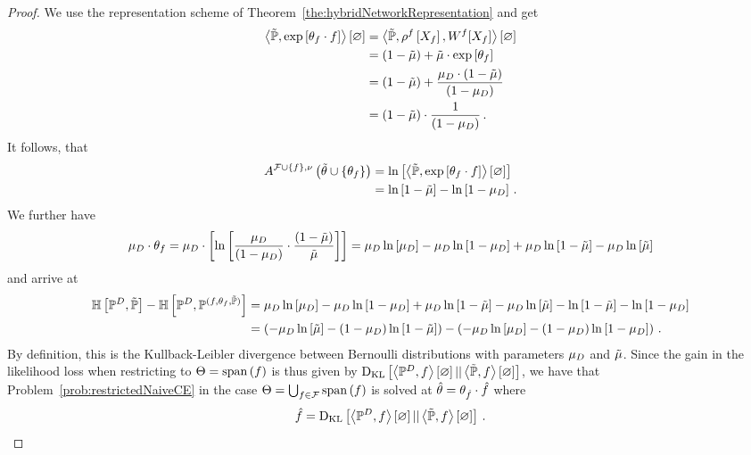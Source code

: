 \begin{proof}
	We use the representation scheme of Theorem~\ref{the:hybridNetworkRepresentation} and get
	\begin{align*}
		\left\langle \tilde{\mathbb{P}}, \mathrm{exp}\left[\theta_{f} \cdot f\right]\right\rangle \left[ \varnothing \right]
		& = \left\langle \tilde{\mathbb{P}}, \rho^{f}\left[X_{f}\right], W^{f}[X_{f}]\right\rangle \left[ \varnothing \right] \\
		& = (1-\tilde{\mu}) + \tilde{\mu}\cdot \mathrm{exp}\left[\theta_{f}\right] \\
		& = (1 - \tilde{\mu}) + \frac{\mu_{D} \cdot (1-\tilde{\mu})}{(1-\mu_{D})} \\
		& = (1-\tilde{\mu}) \cdot \frac{1}{(1-\mu_{D})} \, . 
	\end{align*}
	It follows, that
	\begin{align*}
		A^{\mathcal{F}\cup\{f\},\nu}\left(\tilde{\theta}\cup\{\theta_{f}\}\right)
		& = \ln \left[ \left\langle \tilde{\mathbb{P}}, \mathrm{exp}\left[\theta_{f} \cdot f\right]\right\rangle \left[ \varnothing \right] \right] \\
		& = \ln \left[ 1-\tilde{\mu} \right] - \ln \left[ 1-\mu_{D} \right] \, . 
	\end{align*}
	We further have
	\begin{align*}
		\mu_{D} \cdot \theta_{f}
		= \mu_{D} \cdot \left[ \ln \left[ \frac{\mu_{D}}{(1-\mu_{D})}\cdot \frac{(1-\tilde{\mu})}{\tilde{\mu}} \right]  \right]	
		= \mu_{D} \ln \left[ \mu_{D} \right] - \mu_{D} \ln \left[ 1-\mu_{D} \right] + \mu_{D} \ln \left[ 1-\tilde{\mu} \right] - \mu_{D} \ln \left[ \tilde{\mu} \right]
	\end{align*}
	and arrive at
	\begin{align*}
		\mathbb{H}\left[\mathbb{P}^{D},\tilde{\mathbb{P}}\right]
		- \mathbb{H}\left[\mathbb{P}^{D},\mathbb{P}^{(f,\theta_{f},\tilde{\mathbb{P}})}\right]
		& =  \mu_{D} \ln \left[ \mu_{D} \right] - \mu_{D} \ln \left[ 1-\mu_{D} \right] + \mu_{D} \ln \left[ 1-\tilde{\mu} \right] - \mu_{D} \ln \left[ \tilde{\mu} \right]
		-  \ln \left[ 1-\tilde{\mu} \right] - \ln \left[ 1-\mu_{D} \right] \\
		& = \left( -\mu_{D} \ln \left[ \tilde{\mu} \right] - (1-\mu_{D}) \ln \left[ 1-\tilde{\mu} \right] \right)  - \left( -\mu_{D} \ln \left[ \mu_{D} \right] - (1-\mu_{D}) \ln \left[ 1-\mu_{D} \right] \right) \, . 
	\end{align*}
	By definition, this is the Kullback-Leibler divergence between Bernoulli distributions with parameters $\mu_{D}$ and $\tilde{\mu}$.
	Since the gain in the likelihood loss when restricting to $\Theta = \mathrm{span}\left(f\right)$ is thus given by $\mathrm{D}_{\mathrm{KL}}\left[ \left\langle \mathbb{P}^{D},f\right\rangle \left[ \varnothing \right] || \left\langle \tilde{\mathbb{P}},f\right\rangle \left[ \varnothing \right] \right]$, we have that Problem~\ref{prob:restrictedNaiveCE}  in the case $\Theta = \bigcup_{f\in\mathcal{F}}\mathrm{span}\left(f\right)$ is solved at $\hat{\theta} = \theta_{\hat{f}}\cdot \hat{f}$ where
		\[ \hat{f} = \mathrm{D}_{\mathrm{KL}}\left[ \left\langle \mathbb{P}^{D},f\right\rangle \left[ \varnothing \right] || \left\langle \tilde{\mathbb{P}},f\right\rangle \left[ \varnothing \right] \right] \, . \]
\end{proof}

